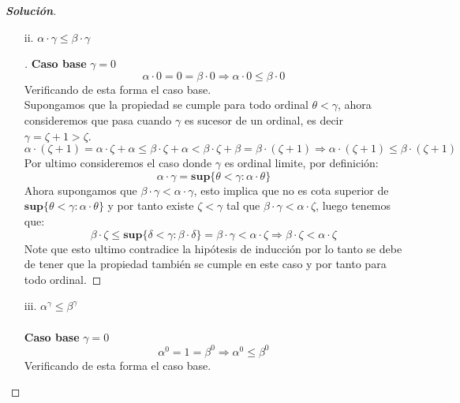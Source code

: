 \documentclass[11pt]{article}
\numberwithin{equation}{section}
\numberwithin{figure}{section}
\begin{document}
\begin{enumerate}
\begin{proof}[\textbf{Solución}]
\begin{itemize}
\begin{proof}[\unskip\nopunct]
        \end{proof}
        \item[ii.]$\alpha\cdot\gamma\leq\beta\cdot\gamma$
        \begin{proof}[\unskip\nopunct]
        \textbf{Caso base} $\gamma=0$
        \begin{equation*}
            \alpha\cdot0=0=\beta\cdot0\Rightarrow\alpha\cdot0\leq\beta\cdot0
        \end{equation*}
        Verificando de esta forma el caso base.\\
        Supongamos que la propiedad se cumple para todo ordinal $\theta<\gamma$, ahora consideremos que pasa cuando $\gamma$ es sucesor de un ordinal, es decir $\gamma=\zeta+1>\zeta$.
        \begin{equation*}
            \alpha\cdot(\zeta+1)=\alpha\cdot\zeta+\alpha\leq\beta\cdot\zeta+\alpha<\beta\cdot\zeta+\beta=\beta\cdot(\zeta+1)\Rightarrow\alpha\cdot(\zeta+1)\leq\beta\cdot(\zeta+1)
        \end{equation*}
        Por ultimo consideremos el caso donde $\gamma$ es ordinal limite, por definición:
        \begin{equation*}
            \alpha\cdot\gamma=\textbf{sup}\{\theta<\gamma:\alpha\cdot\theta\}
        \end{equation*}
        Ahora supongamos que $\beta\cdot\gamma<\alpha\cdot\gamma$, esto implica que no es cota superior de $\textbf{sup}\{\theta<\gamma:\alpha\cdot\theta\}$ y por tanto existe $\zeta<\gamma$ tal que $\beta\cdot\gamma<\alpha\cdot\zeta$, luego tenemos que:
        \begin{equation*}
            \beta\cdot\zeta\leq\textbf{sup}\{\delta<\gamma:\beta\cdot\delta\}=\beta\cdot\gamma<\alpha\cdot\zeta\Rightarrow\beta\cdot\zeta<\alpha\cdot\zeta
        \end{equation*}
        Note que esto ultimo contradice la hipótesis de inducción por lo tanto se debe de tener que la propiedad también se cumple en este caso y por tanto para todo ordinal.
        \end{proof}
        \item[iii.]$\alpha^\gamma\leq\beta^\gamma$\\
        \\
        \textbf{Caso base} $\gamma=0$
        \begin{equation*}
            \alpha^0=1=\beta^0\Rightarrow\alpha^0\leq\beta^0
        \end{equation*}
        Verificando de esta forma el caso base.\\

\end{itemize}
\end{proof}
\end{enumerate}
\end{document}
